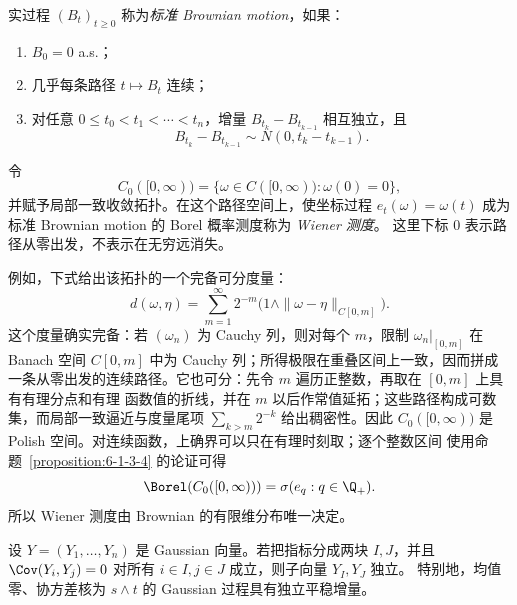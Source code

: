 \begin{definition}\label{def:6-4-1-2}
实过程 $(B_t)_{t\ge0}$ 称为\emph{标准 Brownian motion}，如果：
\begin{enumerate}
  \item $B_0=0$ a.s.；
  \item 几乎每条路径 $t\mapsto B_t$ 连续；
  \item 对任意 $0\le t_0<t_1<\cdots<t_n$，增量
  $B_{t_k}-B_{t_{k-1}}$ 相互独立，且
  \[
    B_{t_k}-B_{t_{k-1}}\sim N(0,t_k-t_{k-1}).
  \]
\end{enumerate}
\end{definition}

\begin{definition}[Wiener 测度]\label{def:6-4-1-3}
令
\[
 C_0([0,\infty))=\{\omega\in C([0,\infty)):\omega(0)=0\},
\]
并赋予局部一致收敛拓扑。在这个路径空间上，使坐标过程
$e_t(\omega)=\omega(t)$ 成为标准 Brownian motion 的 Borel 概率测度称为 \emph{Wiener 测度}。
这里下标 $0$ 表示路径从零出发，不表示在无穷远消失。
\end{definition}

例如，下式给出该拓扑的一个完备可分度量：
\[
 d(\omega,\eta)=\sum_{m=1}^\infty2^{-m}
 \bigl(1\wedge\|\omega-\eta\|_{C[0,m]}\bigr).
\]
这个度量确实完备：若 $(\omega_n)$ 为 Cauchy 列，则对每个 $m$，限制
$\omega_n|_{[0,m]}$ 在 Banach 空间 $C[0,m]$ 中为 Cauchy 列；所得极限在重叠区间上一致，因而拼成
一条从零出发的连续路径。它也可分：先令 $m$ 遍历正整数，再取在 $[0,m]$ 上具有有理分点和有理
函数值的折线，并在 $m$ 以后作常值延拓；这些路径构成可数集，而局部一致逼近与度量尾项
$\sum_{k>m}2^{-k}$ 给出稠密性。因此 $C_0([0,\infty))$ 是 Polish 空间。对连续函数，上确界可以只在有理时刻取；逐个整数区间
使用命题~\ref{proposition:6-1-3-4} 的论证可得
\begin{equation}\label{eq:6-4-1-wiener-borel}
 \Borel(C_0([0,\infty)))
 =\sigma(e_q:q\in\Q_+).
\end{equation}
所以 Wiener 测度由 Brownian 的有限维分布唯一决定。

\begin{proposition}\label{proposition:6-4-1-2}
设 $Y=(Y_1,\ldots,Y_n)$ 是 Gaussian 向量。若把指标分成两块 $I,J$，并且
$\Cov(Y_i,Y_j)=0$ 对所有 $i\in I,j\in J$ 成立，则子向量 $Y_I,Y_J$ 独立。
特别地，均值零、协方差核为 $s\wedge t$ 的 Gaussian 过程具有独立平稳增量。
\end{proposition}

